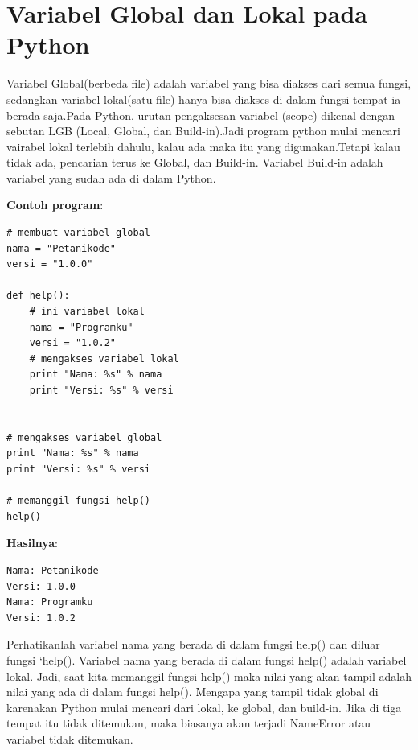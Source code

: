 \section{Variabel Global dan Lokal pada Python}
\par Variabel Global(berbeda file) adalah variabel yang bisa diakses dari semua fungsi, sedangkan variabel lokal(satu file) hanya bisa diakses di dalam fungsi tempat ia berada saja.Pada Python, urutan pengaksesan variabel (scope) dikenal dengan sebutan LGB (Local, Global, dan Build-in).Jadi program python mulai mencari vairabel lokal terlebih dahulu, kalau ada maka itu yang digunakan.Tetapi kalau tidak ada, pencarian terus ke Global, dan Build-in. Variabel Build-in adalah variabel yang sudah ada di dalam Python.
\par\textbf{Contoh program}:
\begin{lstlisting}
# membuat variabel global
nama = "Petanikode"
versi = "1.0.0"

def help():
    # ini variabel lokal
    nama = "Programku"
    versi = "1.0.2"
    # mengakses variabel lokal
    print "Nama: %s" % nama
    print "Versi: %s" % versi


# mengakses variabel global
print "Nama: %s" % nama
print "Versi: %s" % versi

# memanggil fungsi help()
help()
\end{lstlisting}
\par \textbf{Hasilnya}:
\begin{lstlisting}
Nama: Petanikode
Versi: 1.0.0
Nama: Programku
Versi: 1.0.2
\end{lstlisting}
\newpage Perhatikanlah variabel nama yang berada di dalam fungsi help() dan diluar fungsi `help(). Variabel nama yang berada di dalam fungsi help() adalah variabel lokal. Jadi, saat kita memanggil fungsi help() maka nilai yang akan tampil adalah nilai yang ada di dalam fungsi help(). Mengapa yang tampil tidak global di karenakan Python mulai mencari dari lokal, ke global, dan build-in. Jika di tiga tempat itu tidak ditemukan, maka biasanya akan terjadi NameError atau variabel tidak ditemukan.

